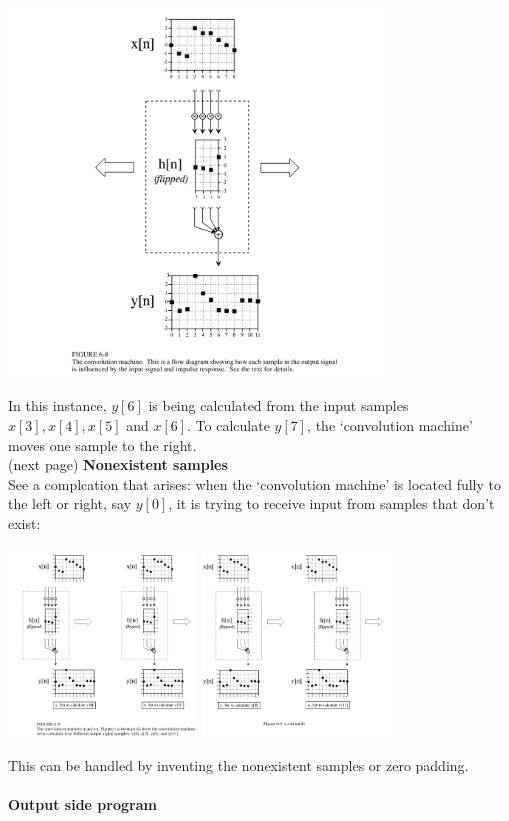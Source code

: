 \documentclass{report}
\begin{document}
\begin{center}
\includegraphics[width=10cm]{a5}\\
\end{center}
In this instance, $y[6]$ is being calculated from the input samples $x[3],x[4],x[5]$ and $x[6]$. 
To calculate $y[7]$, the 
`convolution machine' moves one sample to the right.\\
(next page)\newpage
\noindent\textbf{Nonexistent samples}\\
See a complcation that arises: when the `convolution machine' is located fully to the left or right, say $y[0]$,
it is trying to receive input from samples that don't exist:
\begin{center}
\includegraphics[width=5cm]{a6}
\includegraphics[width=5cm]{a7}\\
\end{center}
This can be handled by inventing the nonexistent samples or zero padding.\\
\vspace{1mm}\\
\textbf{Output side program}\\
\end{document}
